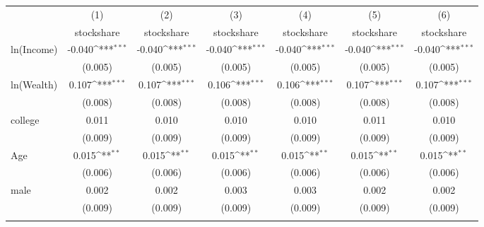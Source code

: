 {
\def\sym#1{\ifmmode^{#1}\else\(^{#1}\)\fi}
\begin{tabular}{l*{6}{c}}
\toprule
                    &\multicolumn{1}{c}{(1)}&\multicolumn{1}{c}{(2)}&\multicolumn{1}{c}{(3)}&\multicolumn{1}{c}{(4)}&\multicolumn{1}{c}{(5)}&\multicolumn{1}{c}{(6)}\\
                    &\multicolumn{1}{c}{stockshare}&\multicolumn{1}{c}{stockshare}&\multicolumn{1}{c}{stockshare}&\multicolumn{1}{c}{stockshare}&\multicolumn{1}{c}{stockshare}&\multicolumn{1}{c}{stockshare}\\
\midrule
ln(Income)          &      -0.040\sym{***}&      -0.040\sym{***}&      -0.040\sym{***}&      -0.040\sym{***}&      -0.040\sym{***}&      -0.040\sym{***}\\
                    &     (0.005)         &     (0.005)         &     (0.005)         &     (0.005)         &     (0.005)         &     (0.005)         \\
\addlinespace
ln(Wealth)          &       0.107\sym{***}&       0.107\sym{***}&       0.106\sym{***}&       0.106\sym{***}&       0.107\sym{***}&       0.107\sym{***}\\
                    &     (0.008)         &     (0.008)         &     (0.008)         &     (0.008)         &     (0.008)         &     (0.008)         \\
\addlinespace
college             &       0.011         &       0.010         &       0.010         &       0.010         &       0.011         &       0.010         \\
                    &     (0.009)         &     (0.009)         &     (0.009)         &     (0.009)         &     (0.009)         &     (0.009)         \\
\addlinespace
Age                 &       0.015\sym{**} &       0.015\sym{**} &       0.015\sym{**} &       0.015\sym{**} &       0.015\sym{**} &       0.015\sym{**} \\
                    &     (0.006)         &     (0.006)         &     (0.006)         &     (0.006)         &     (0.006)         &     (0.006)         \\
\addlinespace
male                &       0.002         &       0.002         &       0.003         &       0.003         &       0.002         &       0.002         \\
                    &     (0.009)         &     (0.009)         &     (0.009)         &     (0.009)         &     (0.009)         &     (0.009)         \\
\addlinespace

\end{tabular}}
